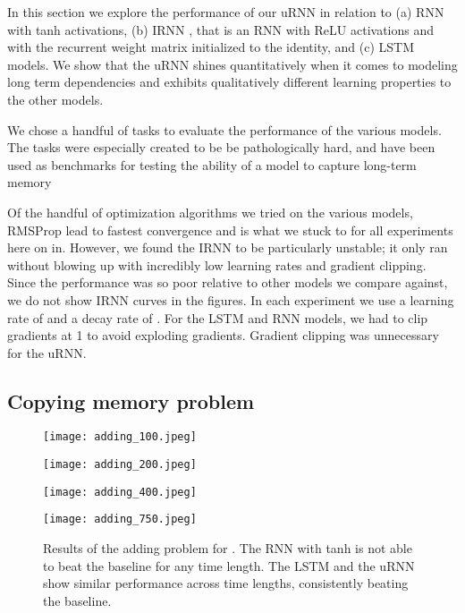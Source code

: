 \documentclass{article}
\begin{document}
In this section we explore the performance of our uRNN in relation to (a) RNN with tanh activations,
(b) IRNN \citep{Quoc2015}, that is 
an RNN with ReLU activations and with the recurrent weight matrix initialized to the identity, 
and (c) LSTM \citep{LSTM} models. We show that the uRNN shines quantitatively when it comes to modeling 
long term dependencies and exhibits qualitatively different learning properties to the other models. 
 
We chose a handful of tasks to evaluate the performance of the various models.
The tasks were especially created to be be pathologically hard, and have been used 
as benchmarks for testing the ability of a model to capture long-term memory \citep{LSTM, Quoc2015, NTM, HF}

Of the handful of optimization algorithms we tried on the various models, 
RMSProp \citep{RMSPROP} lead to fastest convergence and is what we stuck to for all
experiments here on in. However, we found the IRNN to be particularly unstable; it only ran without 
blowing up with incredibly low learning rates and gradient clipping. Since the performance was so poor
relative to other models we compare against, we do not show IRNN curves in the figures.  
In each experiment we use a learning rate of 
and a decay rate of . For the LSTM and RNN models, we had to clip gradients at 1 to avoid exploding 
gradients. Gradient clipping was unnecessary for the uRNN.


\subsection{Copying memory problem}
\begin{figure*}[t!] 
  \begin{minipage}[b]{0.5\linewidth}
    \centering
    \texttt{[image: adding\_100.jpeg]}
  \end{minipage}\begin{minipage}[b]{0.5\linewidth}
    \centering
    \texttt{[image: adding\_200.jpeg]}
    \end{minipage} 
  \begin{minipage}[b]{0.5\linewidth}
    \centering
    \texttt{[image: adding\_400.jpeg]}
    \end{minipage}\begin{minipage}[b]{0.5\linewidth}
    \centering
    \texttt{[image: adding\_750.jpeg]}
  \end{minipage} 
  \caption{Results of the adding problem for . The RNN with tanh
	  is not able to beat the baseline for any time length. The LSTM and the uRNN show similar 
	  performance across time lengths, consistently beating the baseline.}
  \label{fig2} 
\end{figure*}
\end{document}
